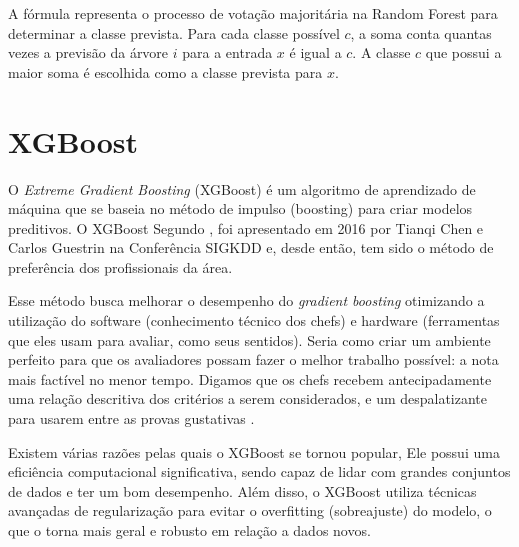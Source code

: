 \documentclass[12pt,oneside,a4paper,chapter=TITLE,
			   english,brazil]{abntex2}
\begin{document}
A fórmula representa o processo de votação majoritária na Random Forest para determinar a classe prevista. Para cada classe possível \(c\), a soma conta quantas vezes a previsão da árvore \(i\) para a entrada \(x\) é igual a \(c\). A classe \(c\) que possui a maior soma é escolhida como a classe prevista para \(x\).  %



\vspace{\onelineskip}

\section{XGBoost}
\vspace{\onelineskip}

O  \textit{Extreme Gradient Boosting} (XGBoost) é um algoritmo de aprendizado de máquina que se baseia no método de impulso (boosting) para criar modelos preditivos. O XGBoost  Segundo ,   foi apresentado em 2016 por Tianqi Chen e Carlos Guestrin na Conferência SIGKDD e, desde então, tem sido o método de preferência dos profissionais da área.


 Esse método busca melhorar o desempenho do \textit{gradient boosting} otimizando a utilização do software (conhecimento técnico dos chefs) e hardware (ferramentas que eles usam para avaliar, como seus sentidos). Seria como criar um ambiente perfeito para que os avaliadores possam fazer o melhor trabalho possível: a nota mais factível no menor tempo. Digamos que os chefs recebem antecipadamente uma relação descritiva dos critérios a serem considerados, e um despalatizante para usarem entre as provas gustativas \cite{Iaexpert}.  

Existem várias razões pelas quais o XGBoost se tornou popular, Ele possui uma eficiência computacional significativa, sendo capaz de lidar com grandes conjuntos de dados e ter um bom desempenho. Além disso, o XGBoost utiliza técnicas avançadas de regularização para evitar o overfitting (sobreajuste) do modelo, o que o torna mais geral e robusto em relação a dados novos.
\end{document}
